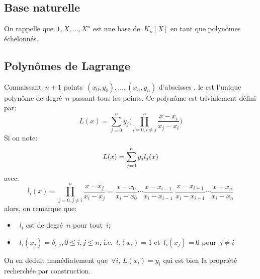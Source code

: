 \subsection{Base naturelle} 
On rappelle que~$1,X,\ldots,X^n$ est une base de~$K_n[X]$ en tant que polynômes échelonnés. 
\subsection{Polynômes de Lagrange} 
Connaissant~$n + 1$ points~$(x_0, y_0),\dots,(x_n, y_n)$ d'abscisses , le  est l'unique polynôme de degré~$n$ passant tous les points. Ce polynôme est trivialement défini par: 
\begin{equation}
L(x) = \sum_{j=0}^{n} y_j \biggl(\prod_{i=0, i\neq j}^{n} \frac{x-x_i}{x_j-x_i} \biggr) 
\end{equation}
Si on note:
\begin{equation}
L(x) = \displaystyle\sum_{j=0}^{n} y_j l_j(x)
\end{equation}
avec:
\begin{equation}
l_i(x) = \prod_{j=0, j\neq i}^{n} \frac{x-x_j}{x_i-x_j} = \frac{x-x_0}{x_i-x_0} \cdots \frac{x-x_{i-1}}{x_i-x_{i-1}} ~ \frac{x-x_{i+1}}{x_i-x_{i+1}} \cdots \frac{x-x_{n}}{x_i-x_{n}}
\end{equation}
alors, on remarque que: 
\begin{itemize}
\item~$l_i$ est de degré~$n$ pour tout~$i$; 
\item~$l_i(x_j) = \delta_{i,j}, 0 \leq i,j \leq n$, i.e.~$l_i(x_i) = 1$ et~$l_i(x_j) = 0$ pour~$j\ne i$ 
\end{itemize}
On en déduit immédiatement que~$\forall i$, $L(x_i) = y_i$ qui est bien la propriété recherchée par construction. 
